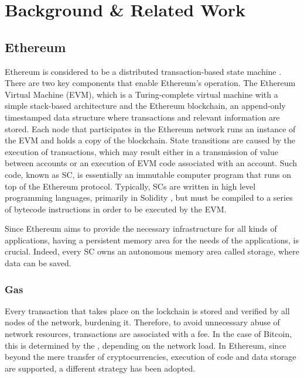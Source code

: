 \chapter{Background \& Related Work}\label{chapter:background}

\section{Ethereum}\label{sec:ethereum}
Ethereum is considered to be a distributed transaction-based state machine \citep{wood_2014}. There are two key components that enable Ethereum’s operation. The Ethereum Virtual Machine (EVM), which is a Turing-complete virtual machine with a simple stack-based architecture and the Ethereum blockchain, an append-only timestamped data structure where transactions and relevant information are stored. Each node that participates in the Ethereum network runs an instance of the EVM and holds a copy of the blockchain. State transitions are caused by the execution of transactions, which may result either in a transmission of value between accounts or an execution of EVM code associated with an account. Such code, known as SC, is essentially an immutable computer program that runs on top of the Ethereum protocol. Typically, SCs are written in high level programming languages, primarily in Solidity \citep{solidity}, but must be compiled to a series of bytecode instructions in order to be executed by the EVM.

Since Ethereum aims to provide the necessary infrastructure for all kinds of applications, having a persistent memory area for the needs of the applications, is crucial. Indeed, every SC owns an autonomous memory area called storage, where data can be saved. 

\subsection{Gas}\label{sec:gas}
Every transaction that takes place on the lockchain is stored and verified by all nodes of the network, burdening it. Therefore, to avoid unnecessary abuse of network resources, transactions are associated with a fee. In the case of Bitcoin, this is determined by the , depending on the network load. In Ethereum, since beyond the mere transfer of cryptocurrencies, execution of code and data storage are supported, a different strategy has been adopted.

